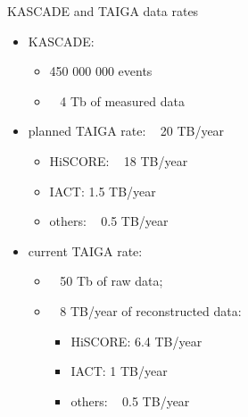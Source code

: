 \begin{frame}{KASCADE and TAIGA data rates}
\begin{minipage}[c]{0.52\textwidth}
  \begin{itemize}
    \item KASCADE:
    \begin{itemize}
      \item 450 000 000 events
      \item ~ 4 Tb of measured data
    \end{itemize}
    \vspace{1em}
    \item planned TAIGA rate: ~ 20 TB/year
    \begin{itemize}
      \item HiSCORE: ~ 18 TB/year
      \item IACT: 1.5 TB/year
      \item others: ~ 0.5 TB/year
    \end{itemize}
  \end{itemize}
\end{minipage}
\hfill
\begin{minipage}[c]{0.47\textwidth}
\vspace{-3.5em}
  \begin{itemize}
    \item current TAIGA rate: 
    \begin{itemize}
      \item ~ 50 Tb of raw data;
      \item ~ 8 TB/year of reconstructed data:
      \begin{itemize}
  \item HiSCORE: 6.4 TB/year
  \item IACT: 1 TB/year
  \item others: ~ 0.5 TB/year
      \end{itemize}
    \end{itemize}
  \end{itemize}
\end{minipage}

\end{frame}

